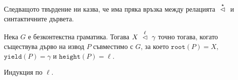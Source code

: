 Следващото твърдение ни казва, че има пряка връзка между релацията $~\stackrel{{\star}}{\lhd}~$ и синтактичните дървета.

\begin{important}
  \begin{proposition}\label{pr:yield-relation:parse-tree}
    Нека $G$ е безконтекстна граматика. Тогава
    $X ~\stackrel{{\ell}}{\lhd}~ \gamma$ точно тогава, когато съществува дърво на извод $P$ съвместимо с $G$, за което
    $\texttt{root}(P) = X$, $\texttt{yield}(P) = \gamma$ и $\texttt{height}(P) = \ell$.
  \end{proposition}
\end{important}
\begin{hint}
  Индукция по $\ell$.
\end{hint}



